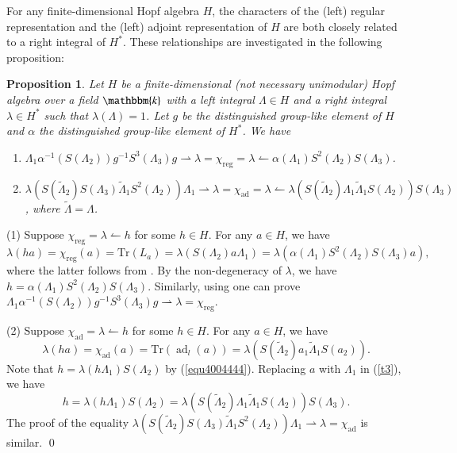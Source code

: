 \documentclass[11pt]{amsart}
\newtheorem{prop}[thm]{Proposition}
\numberwithin{equation}{section}
\begin{document}
For any finite-dimensional Hopf algebra $H$, the characters of the (left) regular
representation and the (left) adjoint representation of $H$ are both closely related to a right integral of $H^*$. These relationships are investigated in the following proposition:  
\begin{prop}\label{t5}
Let $H$ be a finite-dimensional (not necessary unimodular) Hopf algebra over a field $\mathbbm{k}$ with a left integral $\Lambda\in H$ and a right integral $\lambda\in H^*$ such that $\lambda(\Lambda)=1$. Let $g$ be the distinguished group-like
element of $H$ and $\alpha$ the distinguished group-like
element of $H^*$. We have
\begin{enumerate}
\item $\Lambda_1\alpha^{-1}(S(\Lambda_2))g^{-1}S^3(\Lambda_3)g\rightharpoonup\lambda=\chi_{\operatorname{reg}}=\lambda\leftharpoonup\alpha(\Lambda_1)S^2(\Lambda_2)S(\Lambda_3)$.
\item  $\lambda(S(\widetilde{\Lambda}_2)S(\Lambda_3)\widetilde{\Lambda}_1S^2(\Lambda_2))\Lambda_1\rightharpoonup \lambda=\chi_{\operatorname{ad}}=\lambda\leftharpoonup \lambda(S(\widetilde{\Lambda}_2)\Lambda_1\widetilde{\Lambda}_1S(\Lambda_2))S(\Lambda_3)$, where $\widetilde{\Lambda}=\Lambda$.
\end{enumerate}
\end{prop}
\proof
(1) Suppose $\chi_{\operatorname{reg}}=\lambda\leftharpoonup h$ for some $h\in H$. For any $a\in H$, we have
\begin{equation}\label{t4}\lambda(ha)=\chi_{\operatorname{reg}}(a)=\text{Tr}(L_a)=\lambda(S(\Lambda_2)a\Lambda_1)=\lambda(\alpha(\Lambda_1)S^2(\Lambda_2)S(\Lambda_3)a),\end{equation}
where the latter follows from \cite[Theorem 3(a)]{Rad}. By the non-degeneracy of $\lambda$, we have $h=\alpha(\Lambda_1)S^2(\Lambda_2)S(\Lambda_3).$
Similarly, using \cite[Theorem 3(b)]{Rad} one can prove $\Lambda_1\alpha^{-1}(S(\Lambda_2))g^{-1}S^3(\Lambda_3)g\rightharpoonup\lambda=\chi_{\operatorname{reg}}$.

(2) Suppose $\chi_{\operatorname{ad}}=\lambda\leftharpoonup h$ for some $h\in H$. For any $a\in H$, we have
\begin{equation}\label{t3}\lambda(ha)=\chi_{\operatorname{ad}}(a)=\text{Tr}(\operatorname{ad}_l(a))=\lambda(S(\widetilde{\Lambda}_2)a_1\widetilde{\Lambda}_1S(a_2)).\end{equation}
Note that  $h=\lambda(h\Lambda_1)S(\Lambda_2)$ by (\ref{equ4004444}). Replacing $a$ with $\Lambda_1$ in (\ref{t3}), we have
$$h=\lambda(h\Lambda_1)S(\Lambda_2)=\lambda(S(\widetilde{\Lambda}_2)\Lambda_1\widetilde{\Lambda}_1S(\Lambda_2))S(\Lambda_3).$$
The proof of the equality $\lambda(S(\widetilde{\Lambda}_2)S(\Lambda_3)\widetilde{\Lambda}_1S^2(\Lambda_2))\Lambda_1\rightharpoonup \lambda=\chi_{\operatorname{ad}}$ is similar.
\qed
\end{document}
